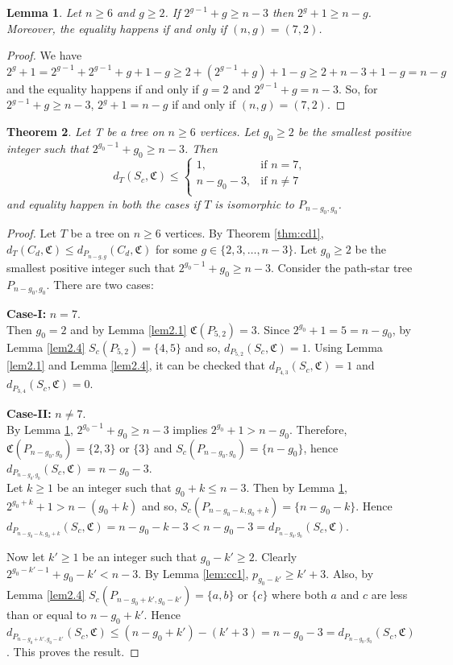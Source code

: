 \documentclass[10pt,a4paper]{amsart}
\newtheorem{theorem}{Theorem}[section]
\newtheorem{lemma}[theorem]{Lemma}
\begin{document}
\begin{lemma}\label{lem:sc2}
Let $n\geq 6$ and $g\geq 2$.  If  $2^{g-1}+g \geq n-3$ then $2^{g}+1\geq n-g$. Moreover, the equality happens if and only if $(n,g)=(7,2)$.
\end{lemma}
\begin{proof}
We have $2^{g}+1=2^{g-1}+2^{g-1}+g+1-g \geq 2+(2^{g-1}+g)+1-g\geq 2+n-3+1-g = n-g$ and the equality happens if and only if  $g=2$ and $2^{g-1}+g = n-3$. So, for  $2^{g-1}+g \geq n-3$,  $2^{g}+1= n-g$ if and only if $(n,g)=(7,2)$.
\end{proof}

\begin{theorem}\label{thm:sc2}
Let T be a tree on $n\geq 6$ vertices. Let $g_0\geq 2$ be the smallest positive integer such that $2^{g_0-1}+g_0\geq n-3$. Then 
$$d_T(S_c,\mathfrak{C})\leq\left\{
\begin{array}{ll}
 1,  &\text{if $n=7$,}\\
 n-g_0-3, &\text{if $n\neq 7$}\\
\end{array}
\right.$$ 
 and equality happen in both the cases if $T$ is isomorphic to $P_{n-g_0,g_0}$.
\end{theorem}

\begin{proof}
Let $T$ be a tree on $n\geq 6$ vertices. By Theorem \ref{thm:cd1}, $d_T(C_d,\mathfrak{C})\leq d_{P_{n-g,g}}(C_d,\mathfrak{C})$ for some $g\in \{2,3,\ldots,n-3\}$.
Let $g_0\geq 2$ be the smallest positive integer such that $2^{g_0-1}+g_0\geq n-3$. Consider the path-star tree $P_{n-g_0,g_0}$. There are two cases:


\textbf{Case-I:} $n=7$.\\
Then $g_0=2$ and by Lemma \ref{lem2.1} $\mathfrak{C}(P_{5,2})=3$. Since $2^{g_0}+1=5=n-g_0$, by Lemma \ref{lem2.4} $S_c(P_{5,2})=\{4,5\}$ and so, $d_{P_{5,2}}(S_c, \mathfrak{C})=1$. Using Lemma \ref{lem2.1} and Lemma \ref{lem2.4}, it can be checked that $d_{P_{4,3}}(S_c, \mathfrak{C})=1$ and $d_{P_{3,4}}(S_c, \mathfrak{C})=0$.


\textbf{Case-II:} $n\neq 7$.\\
By Lemma \ref{lem:sc2},  $2^{g_0-1}+g_0 \geq n-3$  implies $2^{g_0}+1> n-g_0$. Therefore, $\mathfrak{C}(P_{n-g_0,g_0})=\{2,3\}$ or $\{3\}$ and $S_c(P_{n-g_0,g_0})=\{n-g_0\}$, hence $d_{P_{n-g_0,g_0}}(S_c, \mathfrak{C})=n-g_0-3$.\\

Let $k\geq 1$ be an integer such that $g_0+k\leq n-3$. Then by Lemma \ref{lem:sc2}, $2^{g_0+k}+1> n-(g_0+k)$ and so, $S_c(P_{n-g_0-k,g_0+k})=\{n-g_0-k\}$. Hence $d_{P_{n-g_0-k,g_0+k}}(S_c, \mathfrak{C})=n-g_0-k-3<n-g_0-3=d_{P_{n-g_0,g_0}}(S_c, \mathfrak{C})$.

Now let $k'\geq 1$ be an integer such that $g_0-k'\geq 2$. Clearly $2^{g_0-k'-1}+g_0-k'< n-3$. By Lemma \ref{lem:cc1}, $ p_{g_0-k'}\geq k'+3$. Also, by Lemma \ref{lem2.4} $S_c(P_{n-g_0+k',g_0-k'})=\{a,b\}$ or $\{c\}$ where both $a$ and $c$ are less than or equal to $n-g_0+k'$. Hence $d_{P_{n-g_0+k',g_0-k'}}(S_c, \mathfrak{C})\leq (n-g_0+k')-(k'+3)=n-g_0-3=d_{P_{n-g_0,g_0}}(S_c, \mathfrak{C})$. This proves the result.
\end{proof}
\end{document}
